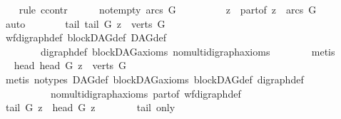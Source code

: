 \begin{isabellebody}
\ \ \isamarkupfalse%
\ {\isacharparenleft}{\kern0pt}rule\ ccontr{\isacharparenright}{\kern0pt}\isanewline
\ \ \ \ \isamarkupfalse%
\ not{\isacharunderscore}{\kern0pt}empty{\isacharcolon}{\kern0pt}\ {\isachardoublequoteopen}arcs\ G\ {\isasymnoteq}{\isacharbraceleft}{\kern0pt}{\isacharbraceright}{\kern0pt}{\isachardoublequoteclose}\ \isanewline
\ \ \ \ \isamarkupfalse%
\ \isamarkupfalse%
\ z\ \ part{\isacharunderscore}{\kern0pt}of{\isacharcolon}{\kern0pt}\ {\isachardoublequoteopen}z\ {\isasymin}\ arcs\ G{\isachardoublequoteclose}\isanewline
\ \ \ \ \ \ \isamarkupfalse%
\ auto\isanewline
\ \ \ \ \isamarkupfalse%
\ \isamarkupfalse%
\ tail{\isacharcolon}{\kern0pt}\ {\isachardoublequoteopen}tail\ G\ z\ {\isasymin}\ verts\ G{\isachardoublequoteclose}\isanewline
\ \ \ \ \ \ \isamarkupfalse%
\ wf{\isacharunderscore}{\kern0pt}digraph{\isacharunderscore}{\kern0pt}def\ blockDAG{\isacharunderscore}{\kern0pt}def\ DAG{\isacharunderscore}{\kern0pt}def\ \isanewline
\ \ \ \ \ \ \ \ digraph{\isacharunderscore}{\kern0pt}def\ blockDAG{\isacharunderscore}{\kern0pt}axioms\ nomulti{\isacharunderscore}{\kern0pt}digraph{\isachardot}{\kern0pt}axioms{\isacharparenleft}{\kern0pt}{}{\isacharparenright}{\kern0pt}\isanewline
\ \ \ \ \ \ \isamarkupfalse%
\ metis\isanewline
\ \ \ \ \isamarkupfalse%
\ \isamarkupfalse%
\ head{\isacharcolon}{\kern0pt}\ {\isachardoublequoteopen}head\ G\ z\ {\isasymin}\ verts\ G{\isachardoublequoteclose}\ \isanewline
\ \ \ \ \ \ \isamarkupfalse%
\ {\isacharparenleft}{\kern0pt}metis\ {\isacharparenleft}{\kern0pt}no{\isacharunderscore}{\kern0pt}types{\isacharparenright}{\kern0pt}\ DAG{\isacharunderscore}{\kern0pt}def\ blockDAG{\isacharunderscore}{\kern0pt}axioms\ blockDAG{\isacharunderscore}{\kern0pt}def\ digraph{\isacharunderscore}{\kern0pt}def\isanewline
\ \ \ \ \ \ \ \ \ \ nomulti{\isacharunderscore}{\kern0pt}digraph{\isachardot}{\kern0pt}axioms{\isacharparenleft}{\kern0pt}{}{\isacharparenright}{\kern0pt}\ part{\isacharunderscore}{\kern0pt}of\ wf{\isacharunderscore}{\kern0pt}digraph{\isacharunderscore}{\kern0pt}def{\isacharparenright}{\kern0pt}\isanewline
\ \ \ \ \isamarkupfalse%
\ \isamarkupfalse%
\ {\isachardoublequoteopen}tail\ G\ z\ {\isacharequal}{\kern0pt}\ head\ G\ z{\isachardoublequoteclose}\isanewline
\ \ \ \ \ \ \isamarkupfalse%
\ tail\ only\ \isamarkupfalse%

\end{isabellebody}
